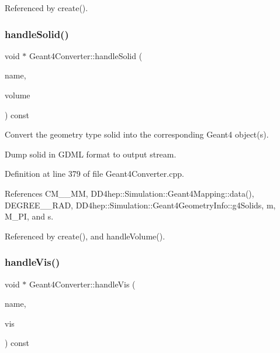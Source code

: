 Referenced by create().

\hypertarget{class_d_d4hep_1_1_simulation_1_1_geant4_converter_a62c57f774d5960afaca5be56562e0770}{}\label{class_d_d4hep_1_1_simulation_1_1_geant4_converter_a62c57f774d5960afaca5be56562e0770} 
\subsubsection{\texorpdfstring{handle\+Solid()}{handleSolid()}}
{\footnotesize\ttfamily void $\ast$ Geant4\+Converter\+::handle\+Solid (\begin{DoxyParamCaption}\item[{const std\+::string \&}]{name,  }\item[{const T\+Geo\+Shape $\ast$}]{volume }\end{DoxyParamCaption}) const\hspace{0.3cm}{\ttfamily [virtual]}}



Convert the geometry type solid into the corresponding Geant4 object(s). 

Dump solid in G\+D\+ML format to output stream. 

Definition at line 379 of file Geant4\+Converter.\+cpp.



References C\+M\+\_\+\_\+\+MM, D\+D4hep\+::\+Simulation\+::\+Geant4\+Mapping\+::data(), D\+E\+G\+R\+E\+E\+\_\+\_\+\+R\+AD, D\+D4hep\+::\+Simulation\+::\+Geant4\+Geometry\+Info\+::g4\+Solids, m, M\+\_\+\+PI, and s.



Referenced by create(), and handle\+Volume().

\hypertarget{class_d_d4hep_1_1_simulation_1_1_geant4_converter_a4cbe5b42273c1ce352acc1c4ec9490a4}{}\label{class_d_d4hep_1_1_simulation_1_1_geant4_converter_a4cbe5b42273c1ce352acc1c4ec9490a4} 
\subsubsection{\texorpdfstring{handle\+Vis()}{handleVis()}}
{\footnotesize\ttfamily void $\ast$ Geant4\+Converter\+::handle\+Vis (\begin{DoxyParamCaption}\item[{const std\+::string \&}]{name,  }\item[{\hyperlink{class_d_d4hep_1_1_simulation_1_1_geant4_mapping_aea00056d988cf94eb39b25514928e3a6}{Vis\+Attr}}]{vis }\end{DoxyParamCaption}) const\hspace{0.3cm}{\ttfamily [virtual]}}



